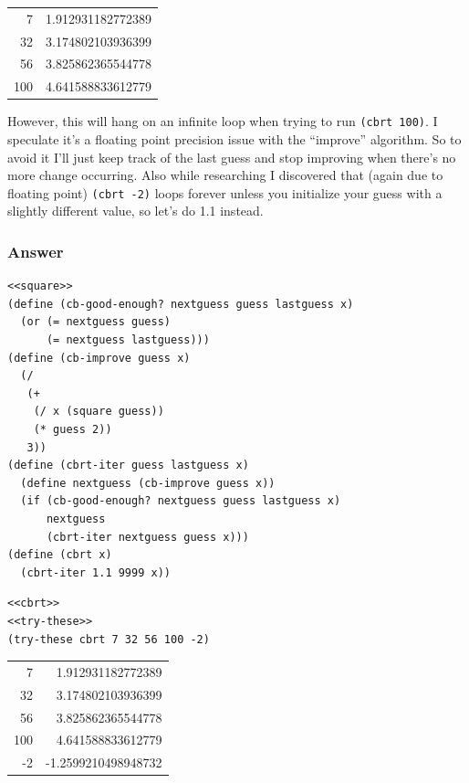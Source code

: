 \documentclass[final,fleqn,titlepage,twoside]{article}
\begin{document}
\begin{center}
\begin{tabular}{rr}
7 & 1.912931182772389\\[0pt]
32 & 3.174802103936399\\[0pt]
56 & 3.825862365544778\\[0pt]
100 & 4.641588833612779\\[0pt]
\end{tabular}
\end{center}

However, this will hang on an infinite loop when trying to run \texttt{(cbrt 100)}. I speculate it's a floating point precision issue with the ``improve''
algorithm. So to avoid it I'll just keep track of the last guess and stop
improving when there's no more change occurring. Also while researching I
discovered that (again due to floating point) \texttt{(cbrt -2)} loops
forever unless you initialize your guess with a slightly different value, so
let's do 1.1 instead.

\subsubsection{Answer}
\label{sec:orgdd46723}
\begin{verbatim}
<<square>>
(define (cb-good-enough? nextguess guess lastguess x)
  (or (= nextguess guess)
      (= nextguess lastguess)))
(define (cb-improve guess x)
  (/
   (+
    (/ x (square guess))
    (* guess 2))
   3))
(define (cbrt-iter guess lastguess x)
  (define nextguess (cb-improve guess x))
  (if (cb-good-enough? nextguess guess lastguess x)
      nextguess
      (cbrt-iter nextguess guess x)))
(define (cbrt x)
  (cbrt-iter 1.1 9999 x))
\end{verbatim}
\begin{verbatim}
<<cbrt>>
<<try-these>>
(try-these cbrt 7 32 56 100 -2)
\end{verbatim}

\begin{center}
\begin{tabular}{rr}
7 & 1.912931182772389\\[0pt]
32 & 3.174802103936399\\[0pt]
56 & 3.825862365544778\\[0pt]
100 & 4.641588833612779\\[0pt]
-2 & -1.2599210498948732\\[0pt]
\end{tabular}
\end{center}
\end{document}
